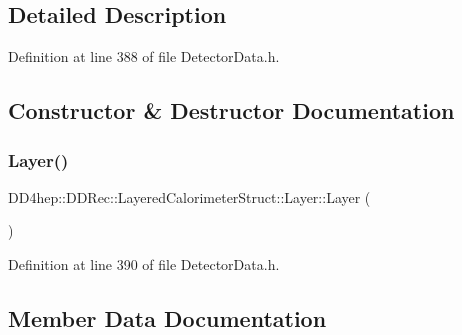 \subsection{Detailed Description}


Definition at line 388 of file Detector\+Data.\+h.



\subsection{Constructor \& Destructor Documentation}
\hypertarget{struct_d_d4hep_1_1_d_d_rec_1_1_layered_calorimeter_struct_1_1_layer_ad13df3e5858587a746ce2d5029341010}{}\label{struct_d_d4hep_1_1_d_d_rec_1_1_layered_calorimeter_struct_1_1_layer_ad13df3e5858587a746ce2d5029341010} 
\subsubsection{\texorpdfstring{Layer()}{Layer()}}
{\footnotesize\ttfamily D\+D4hep\+::\+D\+D\+Rec\+::\+Layered\+Calorimeter\+Struct\+::\+Layer\+::\+Layer (\begin{DoxyParamCaption}{ }\end{DoxyParamCaption})\hspace{0.3cm}{\ttfamily [inline]}}



Definition at line 390 of file Detector\+Data.\+h.



\subsection{Member Data Documentation}
\hypertarget{struct_d_d4hep_1_1_d_d_rec_1_1_layered_calorimeter_struct_1_1_layer_ad774498891dc9332c4edb5af822edca0}{}\label{struct_d_d4hep_1_1_d_d_rec_1_1_layered_calorimeter_struct_1_1_layer_ad774498891dc9332c4edb5af822edca0} 
